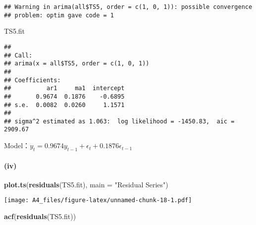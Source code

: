 \documentclass[]{article}
\newenvironment{Shaded}{\begin{snugshade}}{\end{snugshade}}
\newcommand{\DataTypeTok}[1]{\textcolor[rgb]{0.13,0.29,0.53}{#1}}
\newcommand{\DecValTok}[1]{\textcolor[rgb]{0.00,0.00,0.81}{#1}}
\newcommand{\KeywordTok}[1]{\textcolor[rgb]{0.13,0.29,0.53}{\textbf{#1}}}
\newcommand{\NormalTok}[1]{#1}
\newcommand{\OperatorTok}[1]{\textcolor[rgb]{0.81,0.36,0.00}{\textbf{#1}}}
\newcommand{\StringTok}[1]{\textcolor[rgb]{0.31,0.60,0.02}{#1}}
\let\oldparagraph\paragraph
\renewcommand{\paragraph}[1]{\oldparagraph{#1}\mbox{}}
\begin{document}
\begin{Shaded}
\end{Shaded}

\begin{verbatim}
## Warning in arima(all$TS5, order = c(1, 0, 1)): possible convergence
## problem: optim gave code = 1
\end{verbatim}

\begin{Shaded}
\begin{Highlighting}[]
\NormalTok{TS5.fit}
\end{Highlighting}
\end{Shaded}

\begin{verbatim}
## 
## Call:
## arima(x = all$TS5, order = c(1, 0, 1))
## 
## Coefficients:
##          ar1     ma1  intercept
##       0.9674  0.1876    -0.6895
## s.e.  0.0082  0.0260     1.1571
## 
## sigma^2 estimated as 1.063:  log likelihood = -1450.83,  aic = 2909.67
\end{verbatim}

Model：\(y_t = 0.9674 y_{t-1} + \epsilon_t + 0.1876 \epsilon_{t-1}\)

\hypertarget{iv-4}{%
\paragraph{(iv)}\label{iv-4}}

\begin{Shaded}
\begin{Highlighting}[]
\KeywordTok{plot.ts}\NormalTok{(}\KeywordTok{residuals}\NormalTok{(TS5.fit), }\DataTypeTok{main =} \StringTok{"Residual Series"}\NormalTok{)}
\end{Highlighting}
\end{Shaded}

\texttt{[image: A4\_files/figure-latex/unnamed-chunk-18-1.pdf]}

\begin{Shaded}
\begin{Highlighting}[]
\KeywordTok{acf}\NormalTok{(}\KeywordTok{residuals}\NormalTok{(TS5.fit))}
\end{Highlighting}
\end{Shaded}
\end{document}

